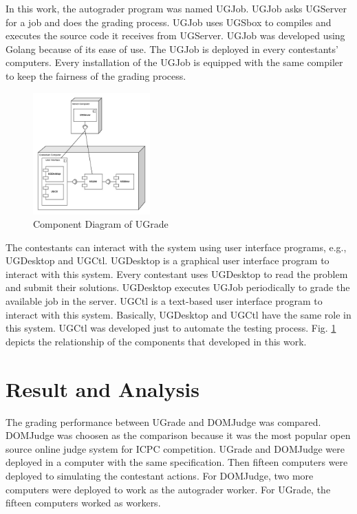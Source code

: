 \documentclass[conference,a4paper]{IEEEtran}
\begin{document}
In this work, the autograder program was named UGJob. UGJob asks UGServer for a job and does the grading process. UGJob uses UGSbox to compiles and executes the source code it receives from UGServer. UGJob was developed using Golang because of its ease of use. The UGJob is deployed in every contestants' computers. Every installation of the UGJob is equipped with the same compiler to keep the fairness of the grading process.

\begin{figure}[htbp]
\centerline{\includegraphics[width=0.4\textwidth]{images/paper-component.jpeg}}
\caption{Component Diagram of UGrade}
\label{component}
\end{figure}

The contestants can interact with the system using user interface programs, e.g., UGDesktop and UGCtl. UGDesktop is a graphical user interface program to interact with this system. Every contestant uses UGDesktop to read the problem and submit their solutions. UGDesktop executes UGJob periodically to grade the available job in the server. UGCtl is a text-based user interface program to interact with this system. Basically, UGDesktop and UGCtl have the same role in this system. UGCtl was developed just to automate the testing process. Fig. \ref{component} depicts the relationship of the components that developed in this work.

\section{Result and Analysis}

The grading performance between UGrade and DOMJudge was compared. DOMJudge was choosen as the comparison because it was the most popular open source online judge system for ICPC competition. UGrade and DOMJudge were deployed in a computer with the same specification. Then fifteen computers were deployed to simulating the contestant actions. For DOMJudge, two more computers were deployed to work as the autograder worker. For UGrade, the fifteen computers worked as workers.
\end{document}

